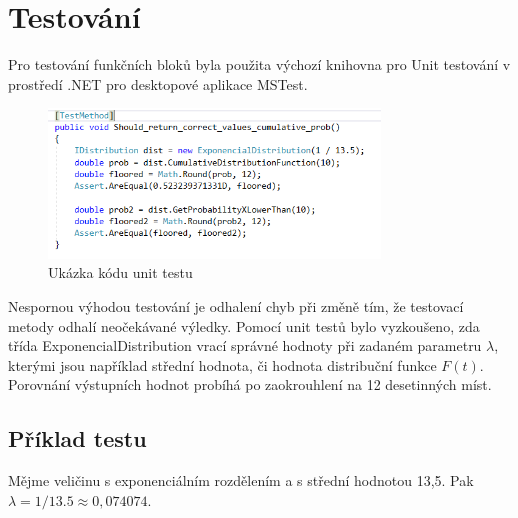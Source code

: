 \documentclass[FM,RP]{tulthesis}
\begin{document}
    \section*{Testování}
        Pro testování funkčních bloků byla použita výchozí knihovna pro Unit testování v prostředí .NET pro desktopové aplikace MSTest.
                \begin{figure}
            \begin{center}
                \includegraphics[width=250pt]{pic/testMethod.png}
                \caption{Ukázka kódu unit testu}
            \end{center}
        \end{figure}
        Nespornou výhodou testování je odhalení chyb při změně tím, že testovací metody odhalí neočekávané výledky.
        Pomocí unit testů bylo vyzkoušeno, zda třída ExponencialDistribution vrací správné hodnoty při zadaném parametru $ \lambda $, 
        kterými jsou například střední hodnota, či hodnota distribuční funkce $ F(t) $. Porovnání výstupních hodnot probíhá po zaokrouhlení na 12 desetinných míst.

        \subsection*{Příklad testu}
            Mějme veličinu s exponenciálním rozdělením a s střední hodnotou 13,5. Pak $\lambda = 1 / 13.5 \approx 0,074074 $.
\end{document}
